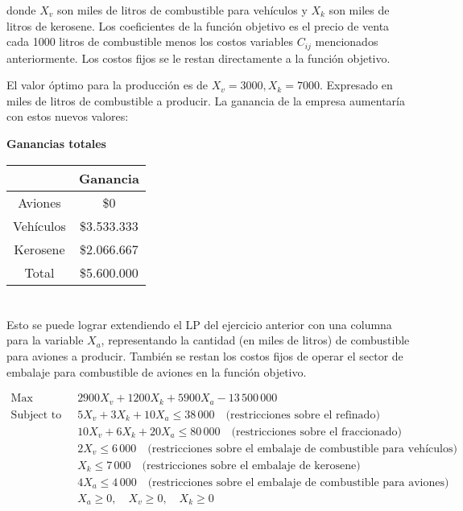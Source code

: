\documentclass[10pt,a4paper]{article}
\begin{document}
donde $X_v$ son miles de litros de combustible para vehículos y  $X_k$ son miles de litros de kerosene. Los coeficientes de la función objetivo es el precio de venta cada 1000 litros de combustible menos los costos variables $C_{ij}$ mencionados anteriormente. Los costos fijos se le restan directamente a la función objetivo.

El valor óptimo para la producción es de $X_v = 3000, X_k = 7000$. Expresado en miles de litros de combustible a producir. La ganancia de la empresa aumentaría con estos nuevos valores:
\clearpage
\begin{center}
	\textbf{Ganancias totales}
	\vspace{3mm}

	\begin{tabular}{| c | c |}
		\hline
		&           Ganancia    \\
		\hline
		Aviones   & \$0  \\
		\hline
		Vehículos & \$3.533.333 \\
		\hline
		Kerosene  & \$2.066.667 \\
		\hline
		Total     & \$5.600.000\\
		\hline
	\end{tabular}
\end{center}

\section{} %

Esto se puede lograr extendiendo el LP del ejercicio anterior con una columna para la variable $X_a$, representando la cantidad (en miles de litros) de combustible para aviones a producir. También se restan los costos fijos de operar el sector de embalaje para combustible de aviones en la función objetivo.

\begin{align*}
	\text{Max} \quad & 2900 X_v + 1200 X_k + 5900 X_a  - 13\,500\,000 \\
	\text{Subject to} \quad
	& 5 X_v + 3 X_k + 10 X_a \leq 38\,000 \quad \text{(restricciones sobre el refinado)} \\
	& 10 X_v + 6 X_k + 20 X_a \leq 80\,000 \quad \text{(restricciones sobre el fraccionado)} \\
	& 2 X_v \leq 6\,000 \quad \text{(restricciones sobre el embalaje de combustible para vehículos)}\\
	& X_k \leq 7\,000 \quad \text{(restricciones sobre el embalaje de kerosene)}\\
	& 4 X_a \leq 4\,000 \quad \text{(restricciones sobre el embalaje de combustible para aviones)} \\
	& X_a \geq 0,\quad X_v \geq 0,\quad X_k \geq 0
\end{align*}
\end{document}
